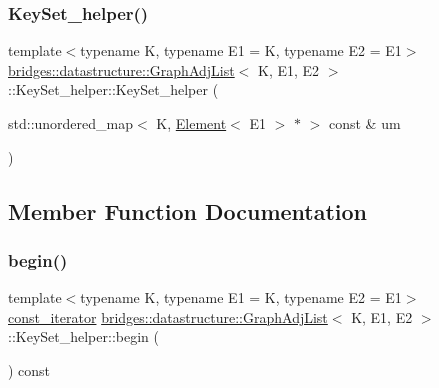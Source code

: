 \subsubsection{\texorpdfstring{Key\+Set\+\_\+helper()}{KeySet\_helper()}}
{\footnotesize\ttfamily template$<$typename K, typename E1 = K, typename E2 = E1$>$ \\
\hyperlink{classbridges_1_1datastructure_1_1_graph_adj_list}{bridges\+::datastructure\+::\+Graph\+Adj\+List}$<$ K, E1, E2 $>$\+::Key\+Set\+\_\+helper\+::\+Key\+Set\+\_\+helper (\begin{DoxyParamCaption}\item[{std\+::unordered\+\_\+map$<$ K, \hyperlink{classbridges_1_1datastructure_1_1_element}{Element}$<$ E1 $>$ $\ast$ $>$ const \&}]{um }\end{DoxyParamCaption})\hspace{0.3cm}{\ttfamily [inline]}}



\subsection{Member Function Documentation}
\mbox{\label{classbridges_1_1datastructure_1_1_graph_adj_list_1_1_key_set__helper_a862efabcacc55dab2c383485fb10fd85}} 
\subsubsection{\texorpdfstring{begin()}{begin()}}
{\footnotesize\ttfamily template$<$typename K, typename E1 = K, typename E2 = E1$>$ \\
\hyperlink{classbridges_1_1datastructure_1_1_graph_adj_list_1_1_key_set__helper_1_1const__iterator}{const\+\_\+iterator} \hyperlink{classbridges_1_1datastructure_1_1_graph_adj_list}{bridges\+::datastructure\+::\+Graph\+Adj\+List}$<$ K, E1, E2 $>$\+::Key\+Set\+\_\+helper\+::begin (\begin{DoxyParamCaption}{ }\end{DoxyParamCaption}) const\hspace{0.3cm}{\ttfamily [inline]}}

